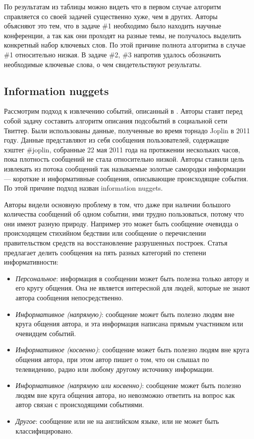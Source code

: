 \documentclass[12pt, a4paper]{article}
\begin{document}
	По результатам из таблицы можно видеть что в первом случае алгоритм справляется со своей задачей существенно хуже, чем в других. Авторы объясняют это тем, что в задаче \#1 необходимо было находить научные конференции, а так как они проходят на разные темы, не получалось выделить конкретный набор ключевых слов. По этой причине полнота алгоритма в случае \#1 относительно низкая. В задаче \#2, \#3 напротив удалось обозначить необходимые ключевые слова, о чем свидетельствуют результаты.
	
	\subsection{Information nuggets}
	Рассмотрим подход к извлечению событий, описанный в \cite{nuggets}. Авторы ставят перед собой задачу составить алгоритм описания подсобытий в социальной сети Твиттер. Были использованы данные, полученные во время торнадо Joplin в 2011 году. Данные представляют из себя сообщения пользователей, содержащие хэштег \#joplin, собранные 22 мая 2011 года на протяжении нескольких часов, пока плотность сообщений не стала относительно низкой. Авторы ставили цель извлекать из потока сообщений так называемые золотые самородки информации --- короткие и информативные сообщения, описывающие происходящие события. По этой причине подход назван information nuggets.
	
	Авторы видели основную проблему в том, что даже при наличии большого количества сообщений об одном событии, ими трудно пользоваться, потому что они имеют разную природу. Например это может быть сообщение очевидца о происходящем стихийном бедствии или сообщение о перечислении правительством средств на восстановление разрушенных построек. Статья предлагает делить сообщения на пять разных категорий по степени информативности:
	\begin{itemize}
	\item\emph{Персональное}:
	информация в сообщении может быть полезна только автору и его кругу общения. Она не является интересной для людей, которые не знают автора сообщения непосредственно.
	\item\emph{Информативное (напрямую)}:
	сообщение может быть полезно людям вне круга общения автора, и эта информация написана прямым участником или очевидцем событий.
	\item\emph{Информативное (косвенно)}:
	сообщение может быть полезно людям вне круга общения автора, при этом автор пишет о том, что он слышал по телевидению, радио или любому другому источнику информации.
	\item\emph{Информативное (напрямую или косвенно)}:
	сообщение может быть полезно людям вне круга общения автора, но невозможно ответить на вопрос как автор связан с происходящими событиями.
	\item\emph{Другое}:
	сообщение или не на английском языке, или не может быть классифицировано.
	\end{itemize}
	
\end{document}

